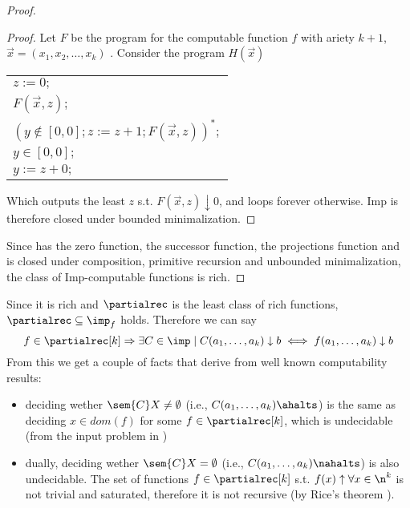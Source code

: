 \begin{proof}
  \begin{proof}
    Let \(F\) be the program for the computable function \(f\)
    with ariety \(k+1\), \(\vec{x} = (x_1, x_2, \dots, x_k)\)
    . Consider the program \(H(\vec{x})\)
    \begin{center}
      \begin{tabular}{l}
        \(z := 0;\)\\[0pt]
        \(F(\vec{x},z);\)\\[0pt]
        \((y \not\in [0,0];z := z + 1;F(\vec{x},z))^*;\)\\[0pt]
        \(y\in [0,0];\)\\[0pt]
        \(y := z + 0;\)\\[0pt]
      \end{tabular}

    \end{center}
    Which outputs the least \(z\) s.t. \(F(\vec{x},z) \downarrow 0\),
    and loops forever otherwise. Imp is therefore closed under bounded
    minimalization.
  \end{proof}
  Since has the zero function, the successor function, the projections
  function and is closed under composition, primitive recursion and
  unbounded minimalization, the class of Imp-computable functions is
  rich.
\end{proof}

Since it is rich and \(\partialrec\) is the least class of rich
functions, \(\partialrec \subseteq \imp_f\) holds. Therefore we can
say \[f \in \partialrec[k] \Rightarrow \exists C \in \imp \mid C(a_1,
\dots, a_k)\downarrow b \iff f(a_1, \dots, a_k) \downarrow b\] From
this we get a couple of facts that derive from well known
computability results:
\begin{itemize}
\item deciding wether \(\sem{C}X \neq \emptyset\) (i.e., \(C(a_1,
  \dots, a_k) \ahalts\)) is the same as deciding \(x \in dom(f)\)
  for some \(f \in \partialrec[k]\), which is undecidable (from the
  input problem in \cite[p.~104]{cutland1980computability})
\item dually, deciding wether \(\sem{C}X = \emptyset\) (i.e., \(C(a_1,
  \dots, a_k)\nahalts\)) is also undecidable. The set of functions
  \(f\in \partialrec[k]\) s.t. \(f(x) \uparrow \forall x \in \n^k\) is
  not trivial and saturated, therefore it is not recursive (by Rice's
  theorem \cite{rice1953classes}).
\end{itemize}
